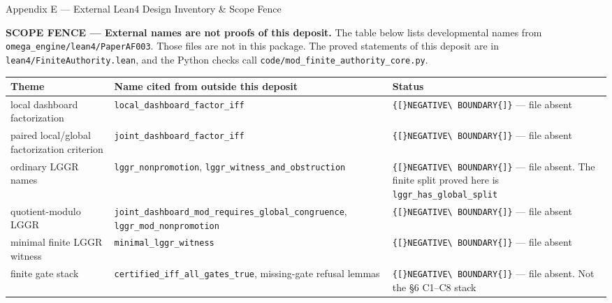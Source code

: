 \documentclass[
  10pt,
]{article}
\renewenvironment{quote}
  {\begin{leftbar}\small}
  {\end{leftbar}}
\DeclareRobustCommand{\texttt}[1]{{\paperSymbolFont\nolinkurl{#1}}}
\begin{document}
Appendix E --- External Lean4 Design Inventory \& Scope Fence

\begin{quote}
\textbf{SCOPE FENCE --- External names are not proofs of this deposit.} The table below lists developmental names from \texttt{omega\_engine/lean4/PaperAF003}. Those files are not in this package. The proved statements of this deposit are in \texttt{lean4/FiniteAuthority.lean}, and the Python checks call \texttt{code/mod\_finite\_authority\_core.py}.
\end{quote}

\begin{longtable}[]{@{}
  >{\raggedright\arraybackslash}p{}
  >{\raggedright\arraybackslash}p{}
  >{\raggedright\arraybackslash}p{}@{}}
\toprule\noalign{}
\begin{minipage}[b]{\linewidth}\raggedright
Theme
\end{minipage} & \begin{minipage}[b]{\linewidth}\raggedright
Name cited from outside this deposit
\end{minipage} & \begin{minipage}[b]{\linewidth}\raggedright
Status
\end{minipage} \\
\midrule\noalign{}
\endhead
\bottomrule\noalign{}
\endlastfoot
local dashboard factorization & \texttt{local\_dashboard\_factor\_iff} & \texttt{{[}NEGATIVE\ BOUNDARY{]}} --- file absent \\
paired local/global factorization criterion & \texttt{joint\_dashboard\_factor\_iff} & \texttt{{[}NEGATIVE\ BOUNDARY{]}} --- file absent \\
ordinary LGGR names & \texttt{lggr\_nonpromotion}, \texttt{lggr\_witness\_and\_obstruction} & \texttt{{[}NEGATIVE\ BOUNDARY{]}} --- file absent. The finite split proved here is \texttt{lggr\_has\_global\_split} \\
quotient-modulo LGGR & \texttt{joint\_dashboard\_mod\_requires\_global\_congruence}, \texttt{lggr\_mod\_nonpromotion} & \texttt{{[}NEGATIVE\ BOUNDARY{]}} --- file absent \\
minimal finite LGGR witness & \texttt{minimal\_lggr\_witness} & \texttt{{[}NEGATIVE\ BOUNDARY{]}} --- file absent \\
finite gate stack & \texttt{certified\_iff\_all\_gates\_true}, missing-gate refusal lemmas & \texttt{{[}NEGATIVE\ BOUNDARY{]}} --- file absent. Not the §6 C1--C8 stack \\

\end{longtable}
\end{document}
